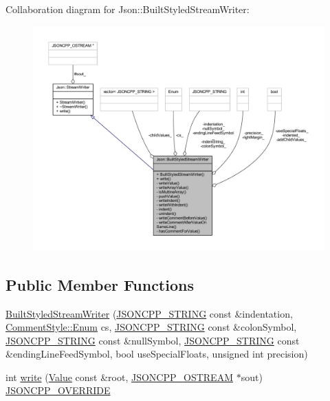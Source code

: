 Collaboration diagram for Json\+:\+:Built\+Styled\+Stream\+Writer\+:\nopagebreak
\begin{figure}[H]
\begin{center}
\leavevmode
\includegraphics[width=350pt]{struct_json_1_1_built_styled_stream_writer__coll__graph}
\end{center}
\end{figure}
\subsection*{Public Member Functions}
\begin{DoxyCompactItemize}
\item 
\hyperlink{struct_json_1_1_built_styled_stream_writer_adf11b7d1ee3c68d096b7c662ee85948e}{Built\+Styled\+Stream\+Writer} (\hyperlink{json_8h_a1e723f95759de062585bc4a8fd3fa4be}{J\+S\+O\+N\+C\+P\+P\+\_\+\+S\+T\+R\+I\+NG} const \&indentation, \hyperlink{struct_json_1_1_comment_style_a51fc08f3518fd81eba12f340d19a3d0c}{Comment\+Style\+::\+Enum} cs, \hyperlink{json_8h_a1e723f95759de062585bc4a8fd3fa4be}{J\+S\+O\+N\+C\+P\+P\+\_\+\+S\+T\+R\+I\+NG} const \&colon\+Symbol, \hyperlink{json_8h_a1e723f95759de062585bc4a8fd3fa4be}{J\+S\+O\+N\+C\+P\+P\+\_\+\+S\+T\+R\+I\+NG} const \&null\+Symbol, \hyperlink{json_8h_a1e723f95759de062585bc4a8fd3fa4be}{J\+S\+O\+N\+C\+P\+P\+\_\+\+S\+T\+R\+I\+NG} const \&ending\+Line\+Feed\+Symbol, bool use\+Special\+Floats, unsigned int precision)
\item 
int \hyperlink{struct_json_1_1_built_styled_stream_writer_a823cdb1afabb6b0d5f39bcd5a6a6f747}{write} (\hyperlink{class_json_1_1_value}{Value} const \&root, \hyperlink{json_8h_a37a25be5fca174927780caeb280094ce}{J\+S\+O\+N\+C\+P\+P\+\_\+\+O\+S\+T\+R\+E\+AM} $\ast$sout) \hyperlink{json_8h_a824d6199c91488107e443226fa6022c5}{J\+S\+O\+N\+C\+P\+P\+\_\+\+O\+V\+E\+R\+R\+I\+DE}
\end{DoxyCompactItemize}
